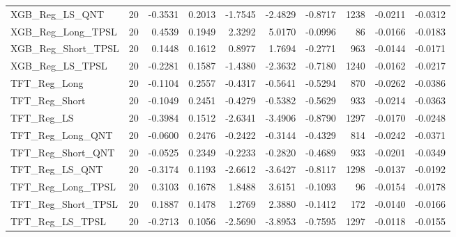 \begin{tabular}{llrrrrrrrr}
\cline{1-10}
XGB\_Reg\_LS\_QNT & 20 & -0.3531 & 0.2013 & -1.7545 & -2.4829 & -0.8717 & 1238 & -0.0211 & -0.0312 \\
\cline{1-10}
XGB\_Reg\_Long\_TPSL & 20 & 0.4539 & 0.1949 & 2.3292 & 5.0170 & -0.0996 & 86 & -0.0166 & -0.0183 \\
\cline{1-10}
XGB\_Reg\_Short\_TPSL & 20 & 0.1448 & 0.1612 & 0.8977 & 1.7694 & -0.2771 & 963 & -0.0144 & -0.0171 \\
\cline{1-10}
XGB\_Reg\_LS\_TPSL & 20 & -0.2281 & 0.1587 & -1.4380 & -2.3632 & -0.7180 & 1240 & -0.0162 & -0.0217 \\
\cline{1-10}
TFT\_Reg\_Long & 20 & -0.1104 & 0.2557 & -0.4317 & -0.5641 & -0.5294 & 870 & -0.0262 & -0.0386 \\
\cline{1-10}
TFT\_Reg\_Short & 20 & -0.1049 & 0.2451 & -0.4279 & -0.5382 & -0.5629 & 933 & -0.0214 & -0.0363 \\
\cline{1-10}
TFT\_Reg\_LS & 20 & -0.3984 & 0.1512 & -2.6341 & -3.4906 & -0.8790 & 1297 & -0.0170 & -0.0248 \\
\cline{1-10}
TFT\_Reg\_Long\_QNT & 20 & -0.0600 & 0.2476 & -0.2422 & -0.3144 & -0.4329 & 814 & -0.0242 & -0.0371 \\
\cline{1-10}
TFT\_Reg\_Short\_QNT & 20 & -0.0525 & 0.2349 & -0.2233 & -0.2820 & -0.4689 & 933 & -0.0201 & -0.0349 \\
\cline{1-10}
TFT\_Reg\_LS\_QNT & 20 & -0.3174 & 0.1193 & -2.6612 & -3.6427 & -0.8117 & 1298 & -0.0137 & -0.0192 \\
\cline{1-10}
TFT\_Reg\_Long\_TPSL & 20 & 0.3103 & 0.1678 & 1.8488 & 3.6151 & -0.1093 & 96 & -0.0154 & -0.0178 \\
\cline{1-10}
TFT\_Reg\_Short\_TPSL & 20 & 0.1887 & 0.1478 & 1.2769 & 2.3880 & -0.1412 & 172 & -0.0140 & -0.0166 \\
\cline{1-10}
TFT\_Reg\_LS\_TPSL & 20 & -0.2713 & 0.1056 & -2.5690 & -3.8953 & -0.7595 & 1297 & -0.0118 & -0.0155 \\
\cline{1-10}
\bottomrule
\end{tabular}
